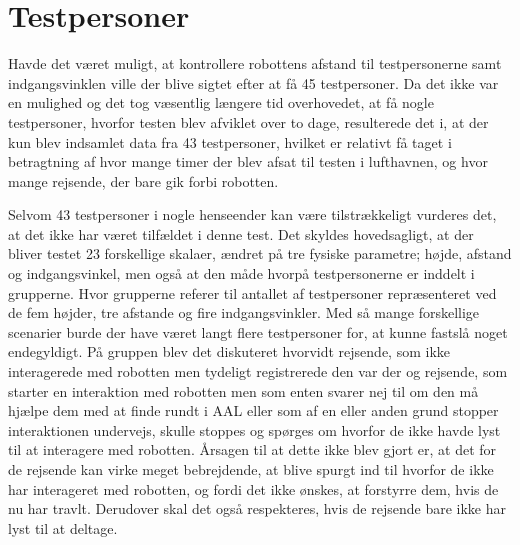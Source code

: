 \section{Testpersoner}
\label{DiskussionTestpersoner}
%
Havde det været muligt, at kontrollere robottens afstand til testpersonerne samt indgangsvinklen ville der blive sigtet efter at få 45 testpersoner. Da det ikke var en mulighed og det tog væsentlig længere tid overhovedet, at få nogle testpersoner, hvorfor testen blev afviklet over to dage, resulterede det i, at der kun blev indsamlet data fra 43 testpersoner, hvilket er relativt få taget i betragtning af hvor mange timer der blev afsat til testen i lufthavnen, og hvor mange rejsende, der bare gik forbi robotten.

Selvom 43 testpersoner i nogle henseender kan være tilstrækkeligt vurderes det, at det ikke har været tilfældet i denne test. Det skyldes hovedsagligt, at der bliver testet 23 forskellige skalaer, ændret på tre fysiske parametre; højde, afstand og indgangsvinkel, men også at den måde hvorpå testpersonerne er inddelt i grupperne. Hvor grupperne referer til antallet af testpersoner repræsenteret ved de fem højder, tre afstande og fire indgangsvinkler. Med så mange forskellige scenarier burde der have været langt flere testpersoner for, at kunne fastslå noget endegyldigt.\blankline
%
På gruppen blev det diskuteret hvorvidt rejsende, som ikke interagerede med robotten men tydeligt registrerede den var der og rejsende, som starter en interaktion med robotten men som enten svarer nej til om den må hjælpe dem med at finde rundt i AAL eller som af en eller anden grund stopper interaktionen undervejs, skulle stoppes og spørges om hvorfor de ikke havde lyst til at interagere med robotten. Årsagen til at dette ikke blev gjort er, at det for de rejsende kan virke meget bebrejdende, at blive spurgt ind til hvorfor de ikke har interageret med robotten, og fordi det ikke ønskes, at forstyrre dem, hvis de nu har travlt. Derudover skal det også respekteres, hvis de rejsende bare ikke har lyst til at deltage. 

